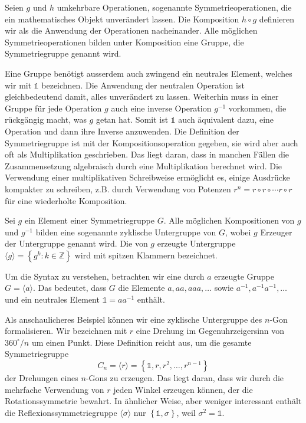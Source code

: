 \begin{definition}[Symmetriegruppe]
  Seien \(g\) und \(h\) umkehrbare Operationen, sogenannte Symmetrieoperationen, die ein mathematisches Objekt unverändert lassen.
  Die Komposition \(h\circ g\) definieren wir als die Anwendung der Operationen nacheinander.
  Alle möglichen Symmetrieoperationen bilden unter Komposition eine Gruppe, die Symmetriegruppe genannt wird.
\end{definition}

Eine Gruppe benötigt ausserdem auch zwingend ein neutrales Element, welches wir mit \(\mathds{1}\) bezeichnen.
Die Anwendung der neutralen Operation ist gleichbedeutend damit, alles unverändert zu lassen.
Weiterhin muss in einer Gruppe für jede Operation \(g\) auch eine inverse Operation \(g^{-1}\) vorkommen, die rückgängig macht, was \(g\) getan hat.
Somit ist \(\mathds{1}\) auch äquivalent dazu, eine Operation und dann ihre Inverse anzuwenden.
 Die Definition der Symmetriegruppe ist mit der Kompositionsoperation gegeben, sie wird aber auch oft als Multiplikation geschrieben.
Das liegt daran, dass in manchen Fällen die Zusammensetzung algebraisch durch eine Multiplikation berechnet wird.
Die Verwendung einer multiplikativen Schreibweise ermöglicht es, einige Ausdrücke kompakter zu schreiben, z.B.
durch Verwendung von Potenzen \(r^n = r\circ r \circ \cdots r\circ r\) für eine wiederholte Komposition.

\begin{definition}
  Sei \(g\) ein Element einer Symmetriegruppe \(G\).
  Alle möglichen Kompositionen von \(g\) und \(g^{-1}\) bilden eine sogenannte zyklische Untergruppe von \(G\), wobei \(g\) Erzeuger der Untergruppe genannt wird.
  Die von \(g\) erzeugte Untergruppe \(\langle g \rangle = \left\{ g^k : k \in \mathbb{Z} \right\}\) wird mit spitzen Klammern bezeichnet.
\end{definition}
\begin{beispiel}
  Um die Syntax zu verstehen, betrachten wir eine durch \(a\) erzeugte Gruppe \(G = \langle a \rangle\).
  Das bedeutet, dass \(G\) die Elemente \(a, aa, aaa, \ldots\) sowie \(a^{-1}, a^{-1}a^{-1}, \ldots\) und ein neutrales Element \(\mathds{1} = aa^{-1}\) enthält.
\end{beispiel}
\begin{beispiel}
  Als anschaulicheres Beispiel können wir eine zyklische Untergruppe des \(n\)-Gon formalisieren.
  Wir bezeichnen mit \(r\) eine Drehung im Gegenuhrzeigersinn von \(360^\circ/n\) um einen Punkt.
  Diese Definition reicht aus, um die gesamte Symmetriegruppe
  \[
    C_n = \langle r \rangle
      = \left\{\mathds{1}, r, r^2, \ldots, r^{n-1}\right\}
  \]
  der Drehungen eines \(n\)-Gons zu erzeugen.
  Das liegt daran, dass wir durch die mehrfache Verwendung von \(r\) jeden Winkel erzeugen k\"onnen, der die Rotationssymmetrie bewahrt.
  In ähnlicher Weise, aber weniger interessant  enthält die Reflexionssymmetriegruppe \(\langle\sigma\rangle\) nur \(\left\{\mathds{1}, \sigma\right\}\), weil \(\sigma^2 = \mathds{1}\).
\end{beispiel}

